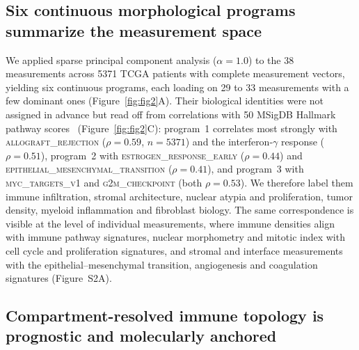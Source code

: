 \subsection{Six continuous morphological programs summarize the measurement space}
\label{sec:results:programs}

We applied
sparse principal component analysis ($\alpha = 1.0$) to the 38 measurements
across \num{5371} TCGA patients with complete measurement vectors, yielding six
continuous programs, each loading on 29 to 33 measurements with a few dominant
ones (Figure~\ref{fig:fig2}A). Their biological identities were not assigned in
advance but read off from correlations with 50 MSigDB Hallmark pathway scores~\cite{liberzon2015}
(Figure~\ref{fig:fig2}C): program~1 correlates most strongly with
\textsc{allograft\_rejection} ($\rho = 0.59$, $n = \num{5371}$) and the
interferon-$\gamma$ response ($\rho = 0.51$), program~2 with
\textsc{estrogen\_response\_early} ($\rho = 0.44$) and
\textsc{epithelial\_mesenchymal\_transition} ($\rho = 0.41$), and program~3 with
\textsc{myc\_targets\_v1} and \textsc{g2m\_checkpoint} (both $\rho = 0.53$). We
therefore label them immune infiltration, stromal architecture, nuclear atypia
and proliferation, tumor density, myeloid inflammation and fibroblast biology.
The same correspondence is
visible at the level of individual measurements, where immune densities align
with immune pathway signatures, nuclear morphometry and mitotic index with cell
cycle and proliferation signatures, and stromal and interface measurements with
the epithelial--mesenchymal transition, angiogenesis and coagulation signatures
(Figure~S2A).

\subsection{Compartment-resolved immune topology is prognostic and molecularly anchored}
\label{sec:results:immune}

